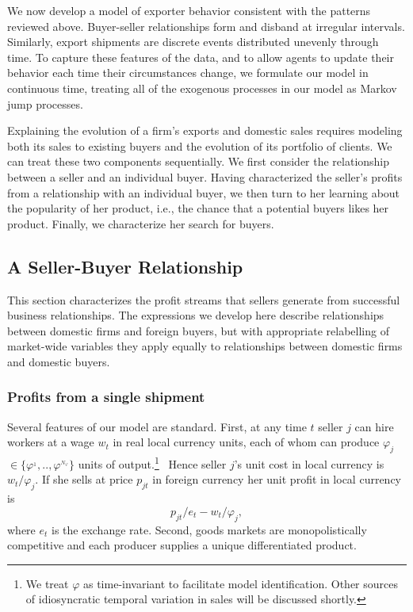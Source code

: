 \documentclass[12pt]{article}
\begin{document}
We now develop a model of exporter behavior consistent with the patterns
reviewed above. Buyer-seller relationships form and disband at irregular
intervals. Similarly, export shipments are discrete events distributed
unevenly through time. To capture these features of the data, and to allow
agents to update their behavior each time their circumstances change, we
formulate our model in continuous time, treating all of the exogenous
processes in our model as Markov jump processes.

Explaining the evolution of a firm's exports and domestic sales requires
modeling both its sales to existing buyers and the evolution of its
portfolio of clients. We can treat these two components sequentially. We
first consider the relationship between a seller and an individual buyer.
Having characterized the seller's profits from a relationship with an
individual buyer, we then turn to her learning about the popularity of her
product, i.e., the chance that a potential buyers likes her product.
Finally, we characterize her search for buyers.

\subsection{A Seller-Buyer Relationship}

This section characterizes the profit streams that sellers generate from
successful business relationships. The expressions we develop here describe
relationships between domestic firms and foreign buyers, but with
appropriate relabelling of market-wide variables they apply equally to
relationships between domestic firms and domestic buyers.

\subsubsection{Profits from a single shipment}

Several features of our model are standard. First, at any time $t$ seller $j$
can hire workers at a wage $w_{t}$ in real local currency units, each of
whom can produce $\varphi _{j}$ $\in \{\varphi ^{_{1}},..,\varphi
^{_{N_{\varphi }}}\}$ units of output.\footnote{%
We treat $\varphi $ as time-invariant to facilitate model identification.
Other sources of idiosyncratic temporal variation in sales will be discussed
shortly.\medskip} \ Hence seller $j$'s unit cost in local currency is $%
w_{t}/\varphi _{j}.$ If she sells at price $p_{jt}$ in foreign currency her
unit profit in local currency is%
\begin{equation}
p_{jt}/e_{t}-w_{t}/\varphi _{j},  \label{unit profit}
\end{equation}%
where $e_{t}$ is the exchange rate. Second, goods markets are
monopolistically competitive and each producer supplies a unique
differentiated product.
\end{document}
